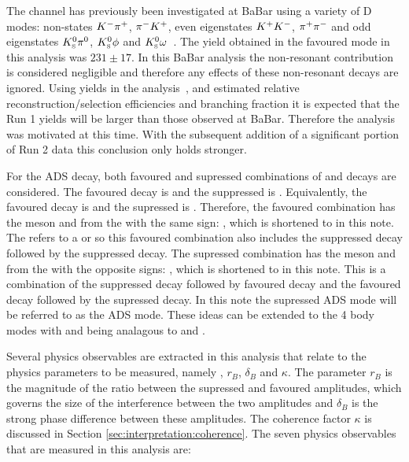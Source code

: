 The \decay{\Bpm}{\D\Kstarpm} channel has previously been investigated at BaBar using a variety of D modes: non-\CP states ${{K}^-}{{\pi}^+}$, ${{\pi}^-}{{K}^+}$, \CP even eigenstates ${{K}^+}{{K}^-}$, ${{\pi}^+}{{\pi}^-}$ and \CP odd eigenstates ${{K}^0_{\mathrm{ \scriptscriptstyle S}}}{{\pi}^0}$, ${{K}^0_{\mathrm{ \scriptscriptstyle S}}}\phi$ and ${{K}^0_{\mathrm{ \scriptscriptstyle S}}}\omega$~\cite{BaBarDKstar}. The yield obtained in the favoured \decay{\Dz}{\Km\pip} mode in this analysis was $231 \pm 17$. In this BaBar analysis the non-resonant \decay{\B}{\D\KS\pi} contribution is considered negligible and therefore any effects of these non-resonant decays are ignored. Using yields in the \decay{\Bpm}{\D\Kpm} analysis~\cite{LHCb-PAPER-2016-003}, and estimated relative reconstruction/selection efficiencies and branching fraction it is expected that the Run 1 yields will be larger than those observed at BaBar. Therefore the analysis was motivated at this time. With the subsequent addition of a significant portion of Run 2 data this conclusion only holds stronger.

For the ADS decay, both favoured and supressed combinations of \Bm and \Dz decays are considered. The favoured \Bm decay is \decay{\Bm}{\Dz\Kstarm} and the suppressed is \decay{\Bm}{\Dzb\Kstarm}. Equivalently, the favoured \Dz decay is \decay{\Dz}{\Km\pip} and the supressed is \decay{\Dz}{\pim\Kp}. Therefore, the favoured combination has the \B meson and \kaon from the \D with the same sign: \decay{\Bm}{\D(\Km\pip)\Kstarm(\KS\pim)}, which is shortened to \decay{\Bm}{\D(\Km\pip)\Kstarm} in this note. The \D refers to a \Dz or \Dzb so this favoured combination also includes the suppressed \B decay followed by the suppressed \D decay. The supressed combination has the \B meson and \kaon from the \D with the opposite signs: \decay{\Bm}{\D(\Kp\pim)\Kstarm(\KS\pim)}, which is shortened to \decay{\Bm}{\D(\Kp\pim)\Kstarm} in this note. This is a combination of the suppressed \D decay followed by favoured \B decay and the favoured \B decay followed by the supressed \D decay. In this note the supressed ADS mode will be referred to as the ADS mode. These ideas can be extended to the 4 body modes with \decay{\Bm}{\D(\Km\pip\pim\pip)\Kstarm(\KS\pim)} and \decay{\Bm}{\D(\Kp\pim\pip\pim)\Kstarm(\KS\pim)} being analagous to \decay{\Bm}{\D(\Km\pip)\Kstarm(\KS\pim)} and \decay{\Bm}{\D(\Kp\pim)\Kstarm(\KS\pim)}.

Several physics observables are extracted in this analysis that relate to the physics parameters to be measured, namely \Pgamma, $r_B$, $\delta_B$ and $\kappa$. The parameter $r_B$ is the magnitude of the ratio between the supressed and favoured amplitudes, which governs the size of the interference between the two amplitudes and $\delta_B$ is the strong phase difference between these amplitudes. The coherence factor $\kappa$ is discussed in Section \ref{sec:interpretation:coherence}. The seven physics observables that are measured in this analysis are:

